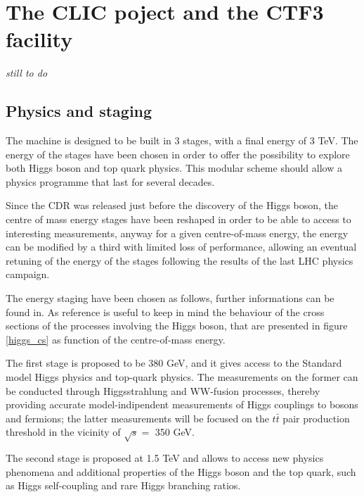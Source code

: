 \section{The CLIC poject and the CTF3 facility}

\begin{center}
\textit{still to do}
\end{center}


\subsection{Physics and staging}

The machine is designed to be built in 3 stages, with a final energy of 3 TeV. The energy of the stages have been chosen in order to offer the possibility to explore both Higgs boson and top quark physics. This modular scheme should allow a physics programme that last for several decades.

Since the CDR\cite{CLIC:cdr} was released just before the discovery of the Higgs boson, the centre of mass energy stages have been reshaped in order to be able to access to interesting measurements, anyway for a given centre-of-mass energy, the energy can be modified by a third with limited loss of performance\cite{CLIC:cdrVol3}, allowing an eventual retuning of the energy of the stages following the results of the last LHC physics campaign.

The energy staging have been chosen as follows, further informations can be found in\cite{CLIC:staging2016,Bozovic-Jelisavcic:2160172}. As reference is useful to keep in mind the behaviour of the cross sections of the processes involving the Higgs boson, that are presented in figure \ref{higgs_cs} as function of the centre-of-mass energy.

The first stage is proposed to be 380 GeV, and it gives access to the Standard model Higgs physics and top-quark physics. The measurements on the former can be conducted through Higgsstrahlung and WW-fusion processes, thereby providing accurate model-indipendent measurements of Higgs couplings to bosons and fermions\cite{Roloff:2210491}; the latter measurements will be focused on the $t\bar{t}$ pair production threshold in the vicinity of $\sqrt{s} = $ 350 GeV.

The second stage is proposed at 1.5 TeV and allows to access new physics phenomena and additional properties of the Higgs boson and the top quark, such as Higgs self-coupling and rare Higgs branching ratios.

